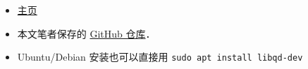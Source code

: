 
\begin{issues}
\issueDraft
\end{issues}

\begin{itemize}
\item \href{https://www.davidhbailey.com/dhbsoftware/}{主页}
\item 本文笔者保存的 \href{https://github.com/MacroUniverse/QD-test}{GitHub 仓库}．
\item Ubuntu/Debian 安装也可以直接用 \verb|sudo apt install libqd-dev|
\end{itemize}
